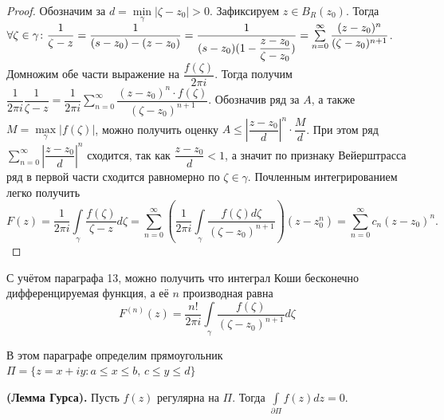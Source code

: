 \begin{proof}
    Обозначим за \(d = \min\limits_\gamma |\zeta - z_0| > 0\). Зафиксируем \(z \in B_R(z_0)\). Тогда
    \(\forall \zeta \in \gamma \colon \dfrac{1}{\zeta - z} \hm= \dfrac{1}{(s-z_0) - (z-z_0)} =
    \dfrac{1}{(s-z_0)(1- \dfrac{z-z_0}{\zeta-z_0})} = \sum\limits_{n=0}^\infty \dfrac{(z-z_0)^n}
    {(\zeta - z_0)^{n+1}}\). Домножим обе части выражение на \(\dfrac{f(\zeta)}{2\pi i}\). Тогда
    получим \(\dfrac{1}{2\pi i} \dfrac{1}{\zeta - z} = \dfrac{1}{2 \pi i}
    \sum\limits_{n=0}^\infty \dfrac{(z-z_0)^n \cdot f(\zeta)}{(\zeta - z_0)^{n+1}}\). Обозначив ряд
    за \(A\), а также \(M = \max\limits_\gamma |f(\zeta)|\), можно получить оценку \(A \le
    \left|\dfrac{z-z_0}{d}\right|^n \cdot \dfrac{M}{d}\). При этом ряд \(\sum\limits_{n=0}^\infty
    \left|\dfrac{z-z_0}{d}\right|^n\) сходится, так как \(\dfrac{z-z_0}{d} < 1\), а значит по
    признаку Вейерштрасса ряд в первой части сходится равномерно по \(\zeta \in \gamma\). Почленным
    интегрированием легко получить
    \[F(z) = \dfrac{1}{2\pi i} \int\limits_\gamma \dfrac{f(\zeta)}{\zeta - z}d\zeta =
    \sum\limits_{n=0}^\infty (\dfrac{1}{2 \pi i} \int\limits_\gamma \dfrac{f(\zeta) d\zeta}
    {(\zeta - z_0)^{n+1}})(z-z_0^n) = \sum\limits_{n=0}^\infty c_n (z-z_0)^n.\]
\end{proof}

\begin{corollary}\label{14:inf_dif_int_koshi}
    С учётом параграфа 13, можно получить что интеграл Коши бесконечно дифференцируемая функция,
    а её \(n\) производная равна
    \[F^{(n)}(z) = \dfrac{n!}{2 \pi i} \int\limits_\gamma \dfrac{f(\zeta)}{(\zeta - z_0)^{n+1}}
    d \zeta\]
\end{corollary}



В этом параграфе определим прямоугольник \(\Pi = \{z = x+iy \colon a \le x \le b, \, c \le y \le
d\}\)

\begin{statement}\label{15:gurs}
    \textbf{(Лемма Гурса).} Пусть \(f(z)\) регулярна на \(\Pi\). Тогда \(\int\limits_{\partial \Pi}
    f(z) dz = 0\).
\end{statement}

